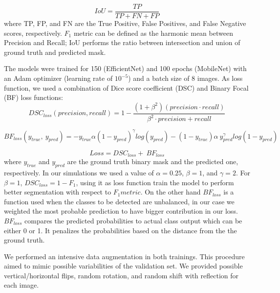 \documentclass[../main.tex]{subfiles}
\begin{document}
\begin{equation}\label{eq:iou}
   IoU=\frac{TP}{TP+FN+FP}
\end{equation}
where TP, FP, and FN are the True Positive, False Positives, and False Negative scores, respectively. $F_1$ metric can be defined as the harmonic mean between Precision and Recall; IoU performs the ratio between intersection and union of ground truth and predicted mask. 

The models were trained for 150 (EfficientNet) and 100 epochs (MobileNet) with an Adam optimizer (learning rate of $10^{-5}$) and a batch size of 8 images. 
As loss function, we used a combination of Dice score coefficient (DSC) and Binary Focal (BF) loss functions:
\begin{equation}\label{eq:dsc-loss}
    DSC_{loss}\left(precision,recall\right)=1-\frac{\left(1+\beta^2\right)\left(precision\cdot recall\right)}{\beta^2\cdot precision+recall}
\end{equation}



\begin{equation}\label{eq:bifocal-loss}
    BF_{loss}\left(y_{true},\ y_{pred}\right)=-y_{true}\alpha\left(1-y_{pred}\right)^\gamma log{\left(y_{pred}\right)}-\left(1-y_{true}\right)\alpha\ y_{pred}^\gamma log\left(1-y_{pred}\right)
\end{equation}

\begin{equation}\label{eq:total-loss}
   Loss=DSC_{loss}+\ BF_{loss}
\end{equation}
where $y_{true}$ and $y_{pred}$ are the ground truth binary mask and the predicted one, respectively.
In our simulations we used a value of $\alpha=0.25$, $\beta=1$, and $\gamma=2$.
For $\beta=1$, $DSC_{loss} = 1 - F_1$, using it as loss function train the model to perform better segmentation with respect to $F_1 metric$. 
On the other hand $BF_{loss}$ is a function used when the classes to be detected are unbalanced, in our case we weighted the most probable prediction to have bigger contribution in our loss.
$BF_{loss}$ compares the predicted probabilities to actual class output which can be either 0 or 1.
It penalizes the probabilities based on the distance from the the ground truth. 


We performed an intensive data augmentation in both trainings.
This procedure aimed to mimic possible variabilities of the validation set. 
We provided possible vertical/horizontal flips, random rotation, and random shift with reflection for each image.
\end{document}
